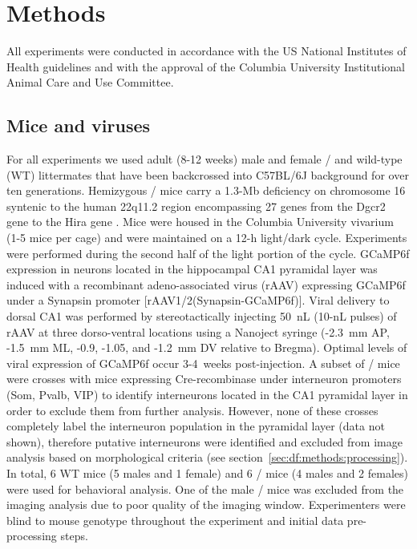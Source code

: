 \section{Methods}

All experiments were conducted in accordance with the US National Institutes of Health guidelines and with the approval of the Columbia University Institutional Animal Care and Use Committee.

\subsection{Mice and viruses}
\label{sec:methods:mice}

For all experiments we used adult (8-12 weeks) male and female \df/ and wild-type (WT) littermates that have been backcrossed into C57BL/6J background for over ten generations. Hemizygous \df/ mice carry a 1.3-Mb deficiency on chromosome 16 syntenic to the human 22q11.2 region encompassing 27 genes from the Dgcr2 gene to the Hira gene \citep{Mukai2008, Stark2008}. Mice were housed in the Columbia University vivarium (1-5 mice per cage) and were maintained on a 12-h light/dark cycle. Experiments were performed during the second half of the light portion of the cycle.  GCaMP6f expression in neurons located in the hippocampal CA1 pyramidal layer was induced with a recombinant adeno-associated virus (rAAV) expressing GCaMP6f under a Synapsin promoter [rAAV1/2(Synapsin-GCaMP6f)]. Viral delivery to dorsal CA1 was performed by stereotactically injecting 50~nL (10-nL pulses) of rAAV at three dorso-ventral locations using a Nanoject syringe (-2.3~mm AP, -1.5~mm ML, -0.9, -1.05, and -1.2~mm DV relative to Bregma). Optimal levels of viral expression of GCaMP6f occur 3-4~weeks post-injection. A subset of \df/ mice were crosses with mice expressing Cre-recombinase under interneuron promoters (Som, Pvalb, VIP) \citep{Lovett-Barron2014} to identify interneurons located in the CA1 pyramidal layer in order to exclude them from further analysis. However, none of these crosses completely label the interneuron population in the pyramidal layer (data not shown), therefore putative interneurons were identified and excluded from image analysis based on morphological criteria (see section~\ref{sec:df:methods:processing}). In total, 6 WT mice (5 males and 1 female) and 6 \df/ mice (4 males and 2 females) were used for behavioral analysis. One of the male \df/ mice was excluded from the imaging analysis due to poor quality of the imaging window. Experimenters were blind to mouse genotype throughout the experiment and initial data pre-processing steps.

